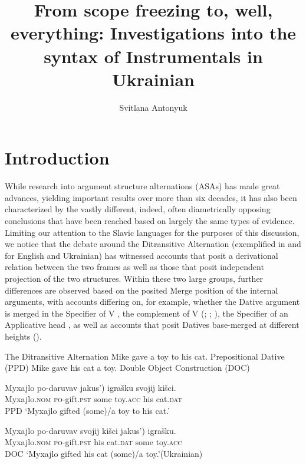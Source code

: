 \documentclass[output=paper,colorlinks,citecolor=brown]{langscibook}
\author{Svitlana Antonyuk\orcid{}\affiliation{University of Graz}}
\title[From scope freezing to, well, everything]{From scope freezing to, well, everything: Investigations into the syntax of Instrumentals in Ukrainian}
\begin{document}
\maketitle

\section{Introduction}\label{sec:antonyuk:1}
While research into argument structure alternations (ASAs) has made great advances, yielding important results over more than six decades, it has also been characterized by the vastly different, indeed, often diametrically opposing conclusions that have been reached based on largely the same types of evidence. Limiting our attention to the Slavic languages for the purposes of this discussion, we notice that the debate around the Ditransitive Alternation (exemplified in  and  for English and Ukrainian) has witnessed accounts that posit a derivational relation between the two frames as well as those that posit independent projection of the two structures. Within these two large groups, further differences are observed based on the posited Merge position of the internal arguments, with accounts differing on, for example, whether the Dative argument is merged in the Specifier of V \citep{GreenbergFranks1991,Franks1995,Richardson2007}, the complement of V (\citealt{Bailyn1995,Bailyn2010, Bailyn2012}; \citealt{Antonyuk2015,Antonyuk2020}; \citealt{Titov2017}), the Specifier of an Applicative head \citep{Dyakonova2009}, as well as accounts that posit Datives base-merged at different heights (\citealt{BonehNash2017}). 

\ea%
    \label{ex:antonyuk:1}
    The Ditransitive Alternation
\ea   Mike gave a toy to his cat.        \hfill Prepositional Dative (PPD)
\ex  Mike gave his cat a toy.       \hfill Double  Object Construction (DOC)
\z
\z

\ea%
    \label{ex:antonyuk:2}
\ea \gll   Myxajlo   po-daruvav   \minsp{(} jakus’) igrašku   svojij kišci.    \\
	Myxajlo.\textsc{nom}     \textsc{po}-gift.\textsc{pst} {} some toy.\textsc{acc}    his cat.\textsc{dat}\\\hfill PPD
\glt ‘Myxajlo gifted (some)/a toy to his cat.’

\ex
\gll Myxajlo   po-daruvav     svojij kišci   \minsp{(} jakus’)  igrašku.    \\
  Myxajlo.\textsc{nom}     \textsc{po}-gift.\textsc{pst} his cat.\textsc{dat}  {}  some toy.\textsc{acc}\\\hfill DOC
\glt `Myxajlo gifted his cat (some)/a toy.’\hfill (Ukrainian)
\z
\z
\end{document}

